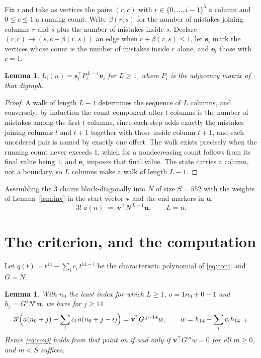 \documentclass[11pt,a4paper]{article}
\theoremstyle{plain}
\newtheorem{lemma}[theorem]{Lemma}
\theoremstyle{definition}
\begin{document}
Fix $i$ and take as vertices the pairs $(r,c)$ with $r\in\{0,\dots,i-1\}^{5}$ a column
and $0\le c\le1$ a running count. Write $\beta(r,s)$ for the number of mistakes joining
columns $r$ and $s$ plus the number of mistakes inside $s$. Declare $(r,c)\to(s,c+\beta(r,s))$
an edge when $c+\beta(r,s)\le1$, let $\mathbf{s}_i$ mark the vertices whose count is the
number of mistakes inside $r$ alone, and $\mathbf{e}_i$ those with $c=1$.

\begin{lemma}\label{lem:walk}
$L_i(n)=\mathbf{s}_i^{\!\top}P_i^{\,L-1}\mathbf{e}_i$ for $L\ge1$, where $P_i$ is the
adjacency matrix of that digraph.
\end{lemma}

\begin{proof}
A walk of length $L-1$ determines the sequence of $L$ columns, and conversely; by induction
the count component after $t$ columns is the number of mistakes among the first $t$ columns,
since each step adds exactly the mistakes joining columns $t$ and $t+1$ together with those
inside column $t+1$, and each unordered pair is named by exactly one offset. The walk exists
precisely when the running count never exceeds $1$, which for a nondecreasing count follows
from its final value being $1$, and $\mathbf{e}_i$ imposes that final value. The state
carries a column, not a boundary, so $L$ columns make a walk of length $L-1$.
\end{proof}

Assembling the $3$ chains block-diagonally into $N$ of size $S=552$ with the weights of
Lemma~\ref{lem:inv} in the start vector $\mathbf{v}$ and the end markers in
$\mathbf{u}$,
\begin{equation}\label{eq:walk2}
3!\;a(n)\;=\;\mathbf{v}^{\!\top}N^{\,L-1}\mathbf{u},\qquad L=n .
\end{equation}

\section{The criterion, and the computation}

Let $q(t)=t^{14}-\sum_i c_i\,t^{14-i}$ be the characteristic polynomial of
\eqref{eq:conj} and $G=N$.

\begin{lemma}\label{lem:crit}
With $n_0$ the least index for which $L\ge1$, $o=1n_0+0-1$ and
$h_j=G^{j}N^{o}\mathbf{u}$, we have for $j\ge14$
\[
3!\Bigl(a(n_0+j)-\sum_i c_i\,a(n_0+j-i)\Bigr)=\mathbf{v}^{\!\top}G^{\,j-14}w,
\qquad w=h_{14}-\sum_i c_ih_{14-i} .
\]
Hence \eqref{eq:conj} holds from that point on if and only if
$\mathbf{v}^{\!\top}G^{m}w=0$ for all $m\ge0$, and $m<S$ suffices.
\end{lemma}
\end{document}

